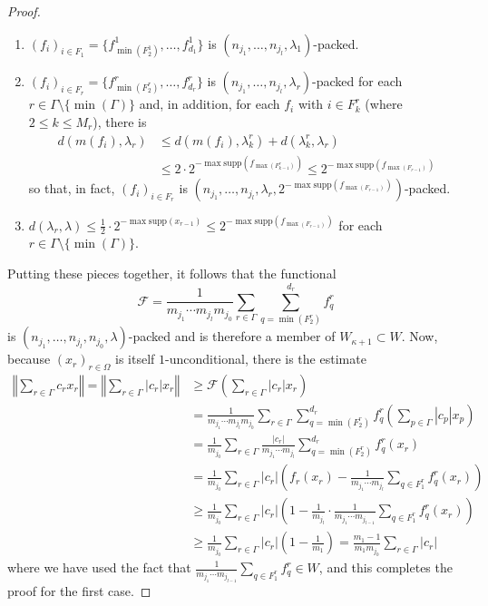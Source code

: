 \documentclass[12pt,a4paper]{amsart}
\newcommand{\bes}{\begin{equation*}}
\newcommand{\ees}{\end{equation*}}
\newcommand{\supp}{\text{supp}}
\theoremstyle{definition}
\theoremstyle{plain}
\begin{document}
\begin{proof}
\begin{enumerate}
\item $(f_{i})_{i\in F_{1}}=\{f^{1}_{\min(F^{1}_{2})},\ldots,f^{1}_{d_{1}}\}$ is $(n_{j_{1}},\ldots,n_{j_{l}},\lambda_{1})$-packed.
\item $(f_{i})_{i\in F_{r}}=\{f^{r}_{\min(F^{r}_{2})},\ldots,f^{r}_{d_{r}}\}$ is $(n_{j_{1}},\ldots,n_{j_{l}},\lambda_{r})$-packed for each $r\in\Gamma\setminus\{\min(\Gamma)\}$ and, in addition, for each $f_{i}$ with $i\in F^{r}_{k}$ (where $2\leq k\leq M_{r}$), there is
\begin{align*} d(m(f_{i}),\lambda_{r}) &\leq d(m(f_{i}),\lambda^{r}_{k})+d(\lambda^{r}_{k},\lambda_{r}) \\ &\leq 2\cdot  2^{-\max\supp(f_{\max(F^{r}_{k-1})})}\leq 2^{-\max\supp(f_{\max(F_{r-1})})}\end{align*}
so that, in fact, $(f_{i})_{i\in F_{r}}$ is $(n_{j_{1}},\ldots,n_{j_{l}},\lambda_{r}, 2^{-\max\supp(f_{\max(F_{r-1})})})$-packed.
\item $d(\lambda_{r},\lambda)\leq\frac{1}{2}\cdot 2^{-\max\supp(x_{r-1})}\leq 2^{-\max\supp(f_{\max(F_{r-1})})}$ for each $r\in\Gamma\setminus\{\min(\Gamma)\}$.
\end{enumerate}
Putting these pieces together, it follows that the functional
\bes \mathscr{F}=\frac{1}{m_{j_{1}}\cdots m_{j_{l}}m_{j_{0}}}\sum_{r\in\Gamma}\sum_{q=\min(F^{r}_{2})}^{d_{r}}f^{r}_{q} \ees
is $(n_{j_{1}},\ldots,n_{j_{l}},n_{j_{0}},\lambda)$-packed and is therefore a member of $W_{\kappa+1}\subset W$. Now, because $(x_{r})_{r\in\Omega}$ is itself $1$-unconditional, there is the estimate
\begin{align*} \left\Vert \sum_{r\in \Gamma}c_{r}x_{r}\right\Vert = \left\Vert \sum_{r\in\Gamma}|c_{r}|x_{r}\right\Vert &\geq\mathscr{F}\left(\sum_{r\in\Gamma}|c_{r}|x_{r}\right) \\ &=\frac{1}{m_{j_{1}}\cdots m_{j_{l}}m_{j_{0}}}\sum_{r\in\Gamma}\sum_{q=\min(F^{r}_{2})}^{d_{r}}f^{r}_{q}\left(\sum_{p\in\Gamma}|c_{p}|x_{p}\right) \\ &=\frac{1}{m_{j_{0}}}\sum_{r\in\Gamma}\frac{|c_{r}|}{m_{j_{1}}\cdots m_{j_{l}}}\sum_{q=\min(F^{r}_{2})}^{d_{r}}f^{r}_{q}(x_{r}) \\ &=\frac{1}{m_{j_{0}}}\sum_{r\in\Gamma}|c_{r}|\left(f_{r}(x_{r})-\frac{1}{m_{j_{1}}\cdots m_{j_{l}}}\sum_{q\in F^{r}_{1}}f^{r}_{q}(x_{r})\right) \\ &\geq \frac{1}{m_{j_{0}}}\sum_{r\in\Gamma}|c_{r}|\left(1 - \frac{1}{m_{j_{l}}}\cdot\frac{1}{m_{j_{1}}\cdots m_{j_{l-1}}}\sum_{q\in F^{r}_{1}}f^{r}_{q}(x_{r})\right) \\ &\geq \frac{1}{m_{j_{0}}}\sum_{r\in\Gamma}|c_{r}|\left(1-\frac{1}{m_{1}}\right) = \frac{m_{1}-1}{m_{1}m_{j_{0}}}\sum_{r\in\Gamma}|c_{r}|\end{align*}
where we have used the fact that $\frac{1}{m_{j_{1}}\cdots m_{j_{l-1}}}\sum_{q\in F^{r}_{1}}f^{r}_{q}\in W$, and this completes the proof for the first case.


\end{proof}
\end{document}

